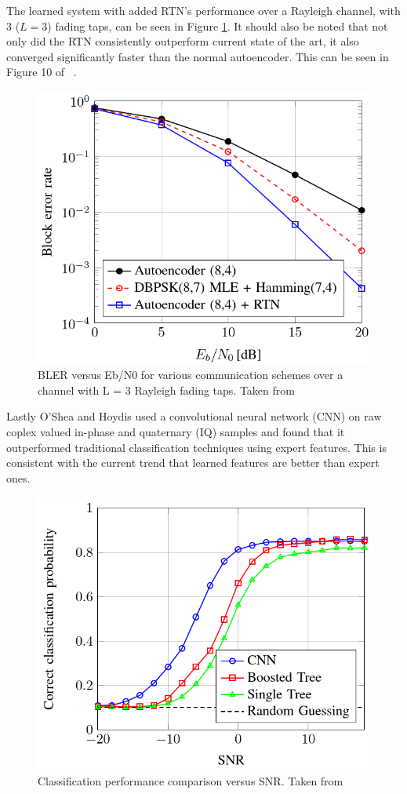 \documentclass[12pt,onecolumn,letterpaper]{article}
\begin{document}
The learned system with added RTN's performance over a Rayleigh channel, with 3 ($L = 3$) fading taps, can be seen in Figure \ref{fig:oSheaRtnRayleigh}. It should also be noted that not only did the RTN consistently outperform current state of the art, it also converged significantly faster than the normal autoencoder. This can be seen in Figure 10 of ~\cite{oShea}.

\begin{figure}[t]
\begin{center}
   \includegraphics[width=0.8\linewidth]{figures/oShea_autoencoder_RTN_rayleigh_comp.PNG}
\end{center}
   \caption{BLER versus Eb/N0 for various communication schemes over a channel with L = 3 Rayleigh fading taps. Taken from~\cite{oShea}}
\label{fig:oSheaRtnRayleigh}
\end{figure}

Lastly O'Shea and Hoydis used a convolutional neural network (CNN) on raw coplex valued in-phase and quaternary (IQ) samples and found that it outperformed traditional classification techniques using expert features. This is consistent with the current trend that learned features are better than expert ones. 

\begin{figure}[t]
\begin{center}
   \includegraphics[width=0.8\linewidth]{figures/oShea_CNN_Rx_classification.PNG}
\end{center}
   \caption{Classification performance comparison versus SNR. Taken from~\cite{oShea}}
\label{fig:oSheaCnnRxClassification}
\end{figure}
\end{document}
